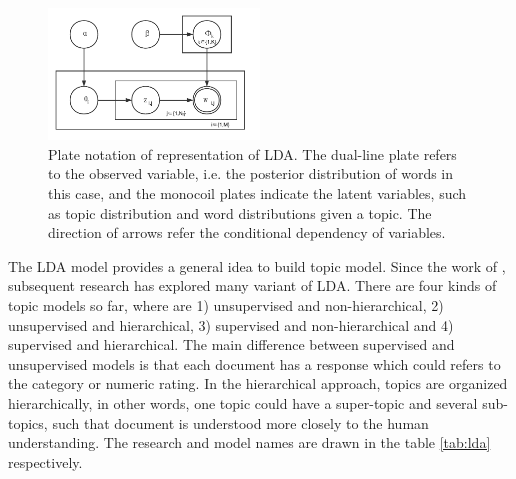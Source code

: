 \begin{figure}[!htb]
    \centering
    \includegraphics[width=0.5\textwidth]{fig/lda.pdf}
    \caption[Plate notation of representation of LDA]{Plate notation of representation of LDA. The dual-line plate refers to the observed variable, i.e. the posterior distribution of words in this case, and the monocoil plates indicate the latent variables, such as topic distribution and word distributions given a topic. The direction of arrows refer the conditional dependency of variables.}
    \label{fig:lda}
\end{figure}

The LDA model provides a general idea to build topic model. Since the work of \cite{Blei:2003}, subsequent research has explored many variant of LDA. There are four kinds of topic models so far, where are 1) unsupervised and non-hierarchical, 2) unsupervised and hierarchical, 3) supervised and non-hierarchical and 4) supervised and hierarchical. The main difference between supervised and unsupervised models is that each document has a response which could refers to the category or numeric rating. In the hierarchical approach, topics are organized hierarchically, in other words, one topic could have a super-topic and several sub-topics, such that document is understood more closely to the human understanding. The research and model names are drawn in the table \ref{tab:lda} respectively.
\begin{table}[!htb]
\centering
{}
\caption{Topic Model Variants of LDA}
\label{tab:lda}
\end{table}

